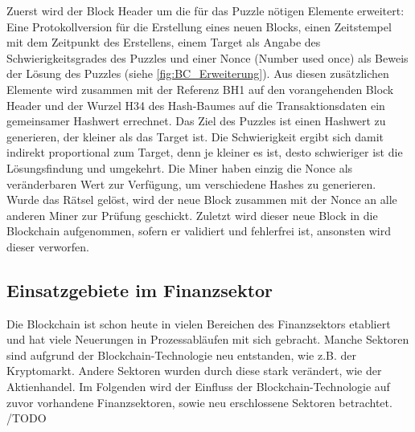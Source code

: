 Zuerst wird der Block Header um die für das Puzzle nötigen Elemente 
erweitert: Eine Protokollversion für die Erstellung eines neuen Blocks, einen Zeitstempel mit
dem Zeitpunkt des Erstellens, einem Target als Angabe des Schwierigkeitsgrades des Puzzles
und einer Nonce (Number used once) als Beweis der Lösung des Puzzles (siehe \autoref{fig:BC_Erweiterung}).
Aus diesen zusätzlichen Elemente wird zusammen mit der Referenz BH1 auf den vorangehenden 
Block Header und der Wurzel H34 des Hash-Baumes auf die Transaktionsdaten ein gemeinsamer 
Hashwert errechnet. 
Das Ziel des Puzzles ist einen Hashwert zu generieren, der kleiner als das Target ist. Die 
Schwierigkeit ergibt sich damit indirekt proportional zum Target, denn je kleiner es ist, desto
schwieriger ist die Lösungsfindung und umgekehrt.
Die Miner haben einzig die Nonce als veränderbaren Wert zur Verfügung, um verschiedene Hashes zu generieren. 
Wurde das Rätsel gelöst, wird der neue Block zusammen mit der Nonce an alle anderen Miner zur Prüfung
geschickt.
Zuletzt wird dieser neue Block in die Blockchain aufgenommen, sofern er validiert und 
fehlerfrei ist, ansonsten wird dieser verworfen.
\cite[p.~22ff]{fill2020blockchain}


\subsection{Einsatzgebiete im Finanzsektor}
Die Blockchain ist schon heute in vielen Bereichen des Finanzsektors etabliert und hat viele Neuerungen
in Prozessabläufen mit sich gebracht. Manche Sektoren sind aufgrund der Blockchain-Technologie neu entstanden, 
wie z.B. der Kryptomarkt. Andere Sektoren wurden durch diese stark verändert, wie der Aktienhandel. 
Im Folgenden wird der Einfluss der Blockchain-Technologie auf zuvor vorhandene Finanzsektoren, sowie neu erschlossene Sektoren 
betrachtet. 
/TODO

